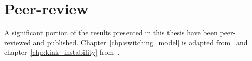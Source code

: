 \chapter{Peer-review}

A significant portion of the results presented in this thesis have been peer-reviewed and published. Chapter~\ref{chp:switching_model} is adapted from~\cite{mactaggartBraginskiiMagnetohydrodynamicsArbitrary2017} and chapter~\ref{chp:kink_instability} from~\cite{quinnEffectAnisotropicViscosity2020a}.
